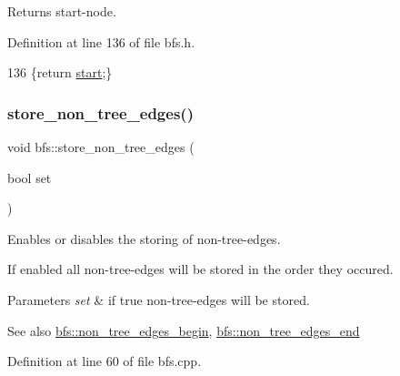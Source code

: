 \begin{DoxyReturn}{Returns}
start-\/node. 
\end{DoxyReturn}


Definition at line 136 of file bfs.\+h.


\begin{DoxyCode}
136 \{\textcolor{keywordflow}{return} \mbox{\hyperlink{classbfs_af2ab561d9e60a9fc2e25b02d1f807f96}{start}};\}
\end{DoxyCode}
\mbox{\label{classbfs_a7de47b820fb9532f497660f767c9457f}} 
\subsubsection{\texorpdfstring{store\+\_\+non\+\_\+tree\+\_\+edges()}{store\_non\_tree\_edges()}\hspace{0.1cm}{\footnotesize\ttfamily [1/2]}}
{\footnotesize\ttfamily void bfs\+::store\+\_\+non\+\_\+tree\+\_\+edges (\begin{DoxyParamCaption}\item[{bool}]{set }\end{DoxyParamCaption})\hspace{0.3cm}{\ttfamily [inherited]}}



Enables or disables the storing of non-\/tree-\/edges. 

If enabled all non-\/tree-\/edges will be stored in the order they occured.


\begin{DoxyParams}{Parameters}
{\em set} & if true non-\/tree-\/edges will be stored. \\
\hline
\end{DoxyParams}
\begin{DoxySeeAlso}{See also}
\mbox{\hyperlink{classbfs_a06d02d2643f184b4c086678771f0ff90}{bfs\+::non\+\_\+tree\+\_\+edges\+\_\+begin}}, \mbox{\hyperlink{classbfs_a9fb470cd36eb487004ca28c1723cabda}{bfs\+::non\+\_\+tree\+\_\+edges\+\_\+end}} 
\end{DoxySeeAlso}


Definition at line 60 of file bfs.\+cpp.



